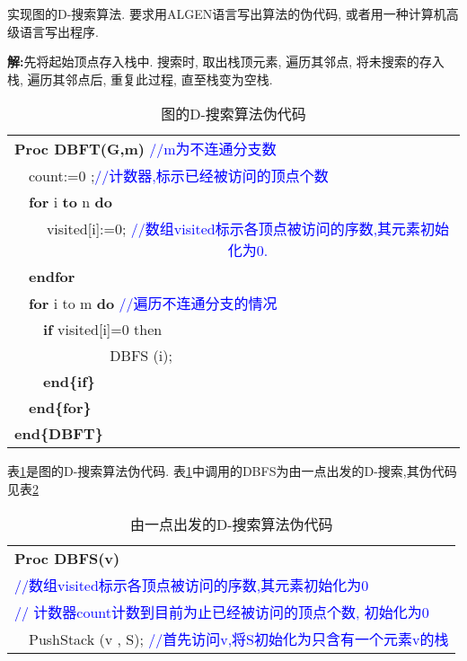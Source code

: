 \begin{problem}[习题1.5]
实现图的D-搜索算法. 要求用ALGEN语言写出算法的伪代码, 或者用一种计算机高级语言写出程序.
\end{problem}
\begin{solution}
\textbf{解:}先将起始顶点存入栈中. 搜索时, 取出栈顶元素, 遍历其邻点, 将未搜索的存入栈, 遍历其邻点后, 重复此过程, 直至栈变为空栈.
\begin{table}[!htb]
\centering
\caption{\label{DsearchG}图的D-搜索算法伪代码}
\begin{tabular}{llllll}
\hline
\multicolumn{6}{l}{\textbf{Proc  DBFT(G,m)}\textcolor{blue}{ //m为不连通分支数}} \\
 & \multicolumn{5}{l}{ count:=0 ;\textcolor{blue}{//计数器,标示已经被访问的顶点个数}} \\
 & \multicolumn{5}{l}{\textbf{for} i \textbf{to} n \textbf{do}} \\
 &  & \multicolumn{4}{c}{visited[i]:=0;\textcolor{blue}{ //数组visited标示各顶点被访问的序数,其元素初始化为0.}} \\
 & \multicolumn{5}{l}{\textbf{end{for}}} \\
 & \multicolumn{5}{l}{\textbf{for} i to m \textbf{do}  \textcolor{blue}{//遍历不连通分支的情况}} \\
 &  & \multicolumn{4}{l}{\textbf{ if} visited[i]=0 then} \\
 &  &  & \multicolumn{3}{l}{DBFS (i); } \\
 &  & \multicolumn{4}{l}{\textbf{end\{if\}}} \\
 & \multicolumn{5}{l}{\textbf{end\{for\}}} \\
\multicolumn{6}{l}{\textbf{end\{DBFT\}}} \\
\hline
\end{tabular}
\end{table}
表\ref{DsearchG}是图的D-搜索算法伪代码. 表\ref{DsearchG}中调用的DBFS为由一点出发的D-搜索,其伪代码见表\ref{DsearchV}
\newpage
\begin{table}[!htb]
\centering
\caption{\label{DsearchV}由一点出发的D-搜索算法伪代码}
\begin{tabular}{llllll}
\hline
\multicolumn{6}{l}{\textbf{Proc DBFS(v)} } \\
\multicolumn{6}{l}{\textcolor{blue}{//数组visited标示各顶点被访问的序数,其元素初始化为0}} \\
\multicolumn{6}{l}{\textcolor{blue}{// 计数器count计数到目前为止已经被访问的顶点个数, 初始化为0}} \\
 & \multicolumn{5}{c}{ PushStack (v , S); \textcolor{blue}{//首先访问v,将S初始化为只含有一个元素v的栈}} \\

\end{tabular}
\end{table}
\end{solution}
